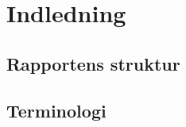 




\chapter{Indledning}

\clearpage

\section{Rapportens struktur}


\section{Terminologi}


\clearpage